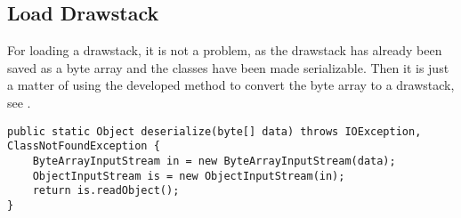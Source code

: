 \subsection*{Load Drawstack}
For loading a drawstack, it is not a problem, as the drawstack has already been saved as a byte array and the classes have been made serializable.
Then it is just a matter of using the developed method to convert the byte array to a drawstack, see .

\begin{lstlisting}[caption={Method for converting byte array to object}, label=lst:desrialize]
public static Object deserialize(byte[] data) throws IOException, ClassNotFoundException {
	ByteArrayInputStream in = new ByteArrayInputStream(data);
	ObjectInputStream is = new ObjectInputStream(in);
	return is.readObject();
}
\end{lstlisting}
          


